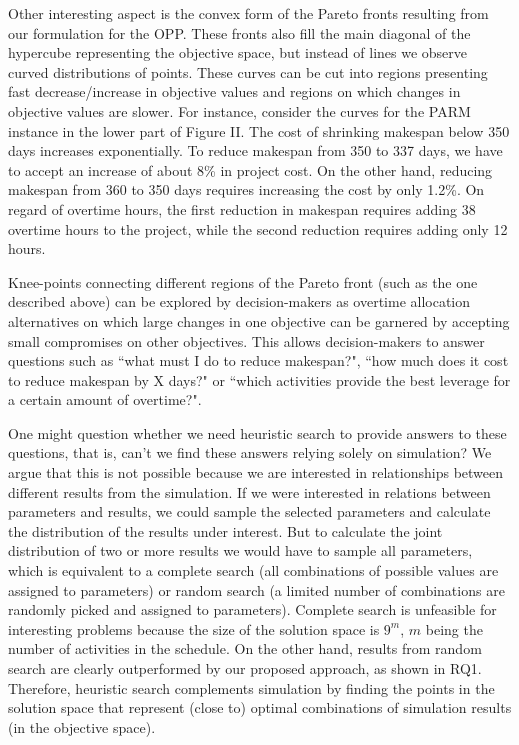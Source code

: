 \documentclass[conference]{IEEEtran}
\begin{document}
Other interesting aspect is the convex form of the Pareto fronts resulting from our formulation for the OPP. These fronts also fill the main diagonal of the hypercube representing the objective space, but instead of lines we observe curved distributions of points. These curves can be cut into regions presenting fast decrease/increase in objective values and regions on which changes in objective values are slower. For instance, consider the curves for the PARM instance in the lower part of Figure II. The cost of shrinking makespan below 350 days increases exponentially. To reduce makespan from 350 to 337 days, we have to accept an increase of about 8\% in project cost. On the other hand, reducing makespan from 360 to 350 days requires increasing the cost by only 1.2\%. On regard of overtime hours, the first reduction in makespan requires adding 38 overtime hours to the project, while the second reduction requires adding only 12 hours. 

Knee-points connecting different regions of the Pareto front (such as the one described above) can be explored by decision-makers as overtime allocation alternatives on which large changes in one objective can be garnered by accepting small compromises on other objectives. This allows decision-makers to answer questions such as ``what must I do to reduce makespan?", ``how much does it cost to reduce makespan by X days?" or ``which activities provide the best leverage for a certain amount of overtime?".

One might question whether we need heuristic search to provide answers to these questions, that is, can't we find these answers relying solely on simulation? We argue that this is not possible because we are interested in relationships between different results from the simulation. If we were interested in relations between parameters and results, we could sample the selected parameters and calculate the distribution of the results under interest. But to calculate the joint distribution of two or more results we would have to sample all parameters, which is equivalent to a complete search (all combinations of possible values are assigned to parameters) or random search (a limited number of combinations are randomly picked and assigned to parameters). Complete search is unfeasible for interesting problems because the size of the solution space is $9^m$, $m$ being the number of activities in the schedule. On the other hand, results from random search are clearly outperformed by our proposed approach, as shown in RQ1. Therefore, heuristic search complements simulation by finding the points in the solution space that represent (close to) optimal combinations of simulation results (in the objective space).
\end{document}
